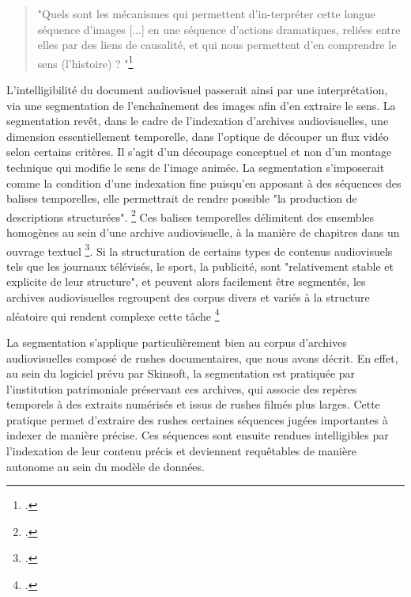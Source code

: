 \begin{quote} 
	
	"Quels sont les mécanismes qui permettent d’in-terpréter cette longue séquence d’images [...] en une séquence d’actions dramatiques, reliées entre elles par des liens de causalité, et qui nous permettent d’en comprendre le sens (l’histoire) ? "\footcite{zotero-item-644} 
	
\end{quote} 

L’intelligibilité du document audiovisuel passerait ainsi par une interprétation, via une segmentation de l’enchaînement des images afin d’en extraire le sens. La segmentation revêt, dans le cadre de l’indexation d’archives audiovisuelles, une dimension essentiellement temporelle, dans l'optique de découper un flux vidéo selon certains critères. Il s'agit d'un découpage conceptuel et non d'un montage technique qui modifie le sens de l’image animée. La segmentation s'imposerait comme la condition d'une indexation fine puisqu'en apposant à des séquences des balises temporelles, elle permettrait de rendre possible "la production de descriptions structurées". \footcite{stockinger2011} Ces balises temporelles délimitent des ensembles homogènes au sein d'une archive audiovisuelle, à la manière de chapitres dans un ouvrage textuel \footcite{stockinger2011}. Si la structuration de certains types de contenus audiovisuels tels que les journaux télévisés, le sport, la publicité, sont "relativement stable et explicite de leur structure", et peuvent alors facilement être segmentés, les archives audiovisuelles regroupent des corpus divers et variés à la structure aléatoire qui rendent complexe cette tâche \footcite{carrive2014} 

La segmentation s’applique particulièrement bien au corpus d’archives audiovisuelles composé de rushes documentaires, que nous avons décrit. En effet, au sein du logiciel prévu par Skinsoft, la segmentation est pratiquée par l’institution patrimoniale préservant ces archives, qui associe des repères temporels à des extraits numérisés et issus de rushes filmés plus larges. Cette pratique permet d’extraire des rushes certaines séquences jugées importantes à indexer de manière précise. Ces séquences sont ensuite rendues intelligibles par l’indexation de leur contenu précis et deviennent requêtables de manière autonome au sein du modèle de données.  

